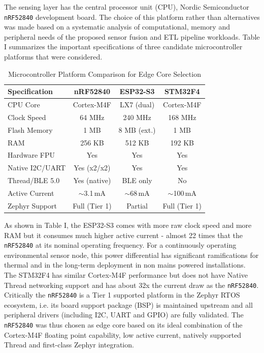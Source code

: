 \documentclass[conference]{IEEEtran}
\begin{document}
The sensing layer has the central processor unit (CPU), Nordic Semiconductor \texttt{nRF52840} development board. The choice of this platform rather than alternatives was made based on a systematic analysis of computational, memory and peripheral needs of the proposed sensor fusion and ETL pipeline workloads. Table I summarizes the important specifications of three candidate microcontroller platforms that were considered.

\begin{table}[htbp]
\caption{Microcontroller Platform Comparison for Edge Core Selection}
\label{tab:mcu_comparison}
\centering
\small
\renewcommand{\arraystretch}{1.3}
\begin{tabular}{|l|c|c|c|}
\hline
\textbf{Specification} & \textbf{nRF52840} & \textbf{ESP32-S3} & \textbf{STM32F4} \\
\hline
CPU Core        & Cortex-M4F      & LX7 (dual)  & Cortex-M4F     \\
\hline
Clock Speed     & 64 MHz          & 240 MHz     & 168 MHz        \\
\hline
Flash Memory    & 1 MB            & 8 MB (ext.) & 1 MB           \\
\hline
RAM             & 256 KB          & 512 KB      & 192 KB         \\
\hline
Hardware FPU    & Yes             & Yes         & Yes            \\
\hline
Native I2C/UART & Yes (x2/x2)     & Yes         & Yes            \\
\hline
Thread/BLE 5.0  & Yes (native)    & BLE only    & No             \\
\hline
Active Current  & $\sim$3.1\,mA   & $\sim$68\,mA & $\sim$100\,mA \\
\hline
Zephyr Support  & Full (Tier 1)   & Partial     & Full (Tier 1)  \\
\hline
\end{tabular}
\end{table}

As shown in Table I, the ESP32-S3 comes with more raw clock speed and more RAM but it consumes much higher active current - almost 22 times that the \texttt{nRF52840} at its nominal operating frequency. For a continuously operating environmental sensor node, this power differential has significant ramifications for thermal and in the long-term deployment in non mains powered installations. The STM32F4 has similar Cortex-M4F performance but does not have Native Thread networking support and has about 32x the current draw as the \texttt{nRF52840}. Critically the \texttt{nRF52840} is a Tier 1 supported platform in the Zephyr RTOS ecosystem, i.e. its board support package (BSP) is maintained upstream and all peripheral drivers (including I2C, UART and GPIO) are fully validated. The \texttt{nRF52840} was thus chosen as edge core based on its ideal combination of the Cortex-M4F floating point capability, low active current, natively supported Thread and first-class Zephyr integration.
\end{document}
